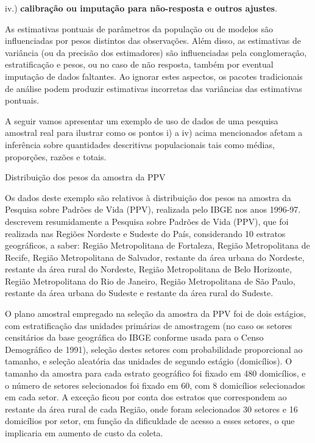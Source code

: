 \documentclass[]{book}
\numberwithin{example}{chapter}
\numberwithin{remark}{chapter}
\numberwithin{definition}{chapter}
\let\BeginKnitrBlock\begin \let\EndKnitrBlock\end
\begin{document}
iv.) \textbf{calibração ou imputação para não-resposta e outros
ajustes}.

As estimativas pontuais de parâmetros da população ou de modelos são
influenciadas por pesos distintos das observações. Além disso, as
estimativas de variância (ou da precisão dos estimadores) são
influenciadas pela conglomeração, estratificação e pesos, ou no caso de
não resposta, também por eventual imputação de dados faltantes. Ao
ignorar estes aspectos, os pacotes tradicionais de análise podem
produzir estimativas incorretas das variâncias das estimativas pontuais.

A seguir vamos apresentar um exemplo de uso de dados de uma pesquisa
amostral real para ilustrar como os pontos i) a iv) acima mencionados
afetam a inferência sobre quantidades descritivas populacionais tais
como médias, proporções, razões e totais.

\BeginKnitrBlock{example}
\protect\hypertarget{ex:unnamed-chunk-1}{}{\label{ex:unnamed-chunk-1}}Distribuição
dos pesos da amostra da PPV
\EndKnitrBlock{example}

Os dados deste exemplo são relativos à distribuição dos pesos na amostra
da Pesquisa sobre Padrões de Vida (PPV), realizada pelo IBGE nos anos
1996-97. \citep{albieri} descrevem resumidamente a Pesquisa sobre
Padrões de Vida (PPV), que foi realizada nas Regiões Nordeste e Sudeste
do País, considerando 10 estratos geográficos, a saber: Região
Metropolitana de Fortaleza, Região Metropolitana de Recife, Região
Metropolitana de Salvador, restante da área urbana do Nordeste, restante
da área rural do Nordeste, Região Metropolitana de Belo Horizonte,
Região Metropolitana do Rio de Janeiro, Região Metropolitana de São
Paulo, restante da área urbana do Sudeste e restante da área rural do
Sudeste.

O plano amostral empregado na seleção da amostra da PPV foi de dois
estágios, com estratificação das unidades primárias de amostragem (no
caso os setores censitários da base geográfica do IBGE conforme usada
para o Censo Demográfico de 1991), seleção destes setores com
probabilidade proporcional ao tamanho, e seleção aleatória das unidades
de segundo estágio (domicílios). O tamanho da amostra para cada estrato
geográfico foi fixado em 480 domicílios, e o número de setores
selecionados foi fixado em 60, com 8 domicílios selecionados em cada
setor. A exceção ficou por conta dos estratos que correspondem ao
restante da área rural de cada Região, onde foram selecionados 30
setores e 16 domicílios por setor, em função da dificuldade de acesso a
esses setores, o que implicaria em aumento de custo da coleta.
\end{document}
